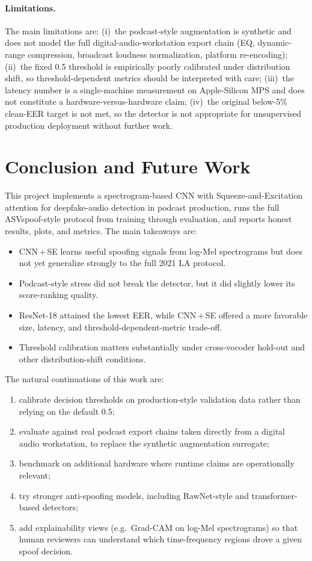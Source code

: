 \documentclass[11pt, letterpaper]{article}
\begin{document}
\paragraph{Limitations.}
The main limitations are: (i)~the podcast-style augmentation is synthetic and does not model the full digital-audio-workstation export chain (EQ, dynamic-range compression, broadcast loudness normalization, platform re-encoding); (ii)~the fixed 0.5 threshold is empirically poorly calibrated under distribution shift, so threshold-dependent metrics should be interpreted with care; (iii)~the latency number is a single-machine measurement on Apple-Silicon MPS and does not constitute a hardware-versus-hardware claim; (iv)~the original below-5\% clean-EER target is not met, so the detector is not appropriate for unsupervised production deployment without further work.

\section{Conclusion and Future Work}\label{sec:conclusion}

This project implements a spectrogram-based CNN with Squeeze-and-Excitation attention for deepfake-audio detection in podcast production, runs the full ASVspoof-style protocol from training through evaluation, and reports honest results, plots, and metrics. The main takeaways are:
\begin{itemize}
    \item CNN\,+\,SE learns useful spoofing signals from log-Mel spectrograms but does not yet generalize strongly to the full 2021 LA protocol.
    \item Podcast-style stress did not break the detector, but it did slightly lower its score-ranking quality.
    \item ResNet-18 attained the lowest EER, while CNN\,+\,SE offered a more favorable size, latency, and threshold-dependent-metric trade-off.
    \item Threshold calibration matters substantially under cross-vocoder hold-out and other distribution-shift conditions.
\end{itemize}

The natural continuations of this work are:
\begin{enumerate}
    \item calibrate decision thresholds on production-style validation data rather than relying on the default 0.5;
    \item evaluate against real podcast export chains taken directly from a digital audio workstation, to replace the synthetic augmentation surrogate;
    \item benchmark on additional hardware where runtime claims are operationally relevant;
    \item try stronger anti-spoofing models, including RawNet-style and transformer-based detectors;
    \item add explainability views (e.g.\ Grad-CAM on log-Mel spectrograms) so that human reviewers can understand which time-frequency regions drove a given spoof decision.
\end{enumerate}
\end{document}
